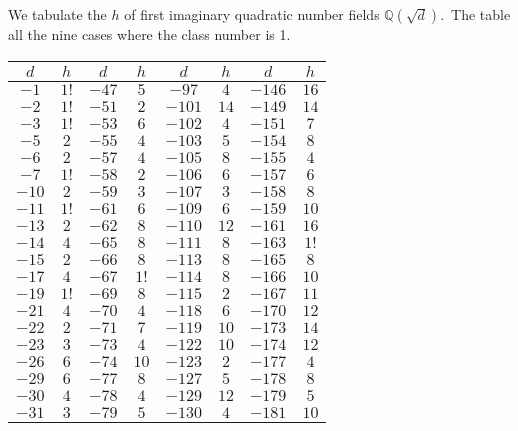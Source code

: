 \documentclass[12pt]{article}
\theoremstyle{definition}
\begin{document}
We tabulate the  $h$ of first imaginary quadratic number fields $\mathbb{Q}(\sqrt{d})$.\, The table  all the nine cases where the class number is 1.\\

\begin{center}
\begin{tabular}{||c|c||c|c||c|c||c|c||}
\hline\hline
$d$ & $h$ & $d$ & $h$ & $d$ & $h$ & $d$ & $h$\\
\hline\hline
$-1$ & $1!$ & $-47$ & $5$ & $-97$ & $4$& $-146$ & $16$\\
\hline
$-2$ & $1!$ & $-51$ & $2$ & $-101$ & $14$& $-149$ & $14$\\
\hline
$-3$ & $1!$ & $-53$ & $6$ & $-102$ & $4$& $-151$ & $7$\\
\hline
$-5$ & $2$ & $-55$ & $4$ & $-103$ & $5$& $-154$ & $8$\\
\hline
$-6$ & $2$ & $-57$ & $4$ & $-105$ & $8$& $-155$ & $4$\\
\hline
$-7$ & $1!$ & $-58$ & $2$ & $-106$ & $6$& $-157$ & $6$\\
\hline
$-10$ & $2$ & $-59$ & $3$ & $-107$ & $3$& $-158$ & $8$\\
\hline
$-11$ & $1!$ & $-61$ & $6$ & $-109$ & $6$& $-159$ & $10$\\
\hline
$-13$ & $2$ & $-62$ & $8$ & $-110$ & $12$& $-161$ & $16$\\
\hline
$-14$ & $4$ & $-65$ & $8$ & $-111$ & $8$& $-163$ & $1!$\\
\hline
$-15$ & $2$ & $-66$ & $8$ & $-113$ & $8$& $-165$ & $8$\\
\hline
$-17$ & $4$ & $-67$ & $1!$ & $-114$ & $8$& $-166$ & $10$\\
\hline
$-19$ & $1!$ & $-69$ & $8$ & $-115$ & $2$& $-167$ & $11$\\
\hline
$-21$ & $4$ & $-70$ & $4$ & $-118$ & $6$& $-170$ & $12$\\
\hline
$-22$ & $2$ & $-71$ & $7$ & $-119$ & $10$& $-173$ & $14$\\
\hline
$-23$ & $3$ & $-73$ & $4$ & $-122$ & $10$& $-174$ & $12$\\
\hline
$-26$ & $6$ & $-74$ & $10$ & $-123$ & $2$& $-177$ & $4$\\
\hline
$-29$ & $6$ & $-77$ & $8$ & $-127$ & $5$& $-178$ & $8$\\
\hline
$-30$ & $4$ & $-78$ & $4$ & $-129$ & $12$& $-179$ & $5$\\
\hline
$-31$ & $3$ & $-79$ & $5$ & $-130$ & $4$& $-181$ & $10$\\

\end{tabular}
\end{center}
\end{document}
